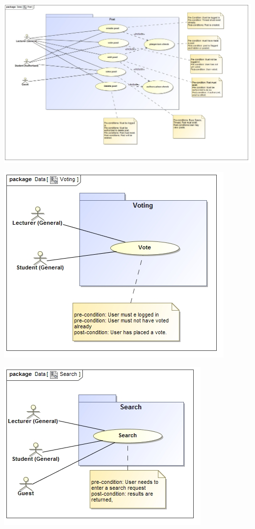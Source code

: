 \documentclass[12pt, oneside]{article}
\begin{document}
\begin{center}
			 \includegraphics[scale=0.45]{Post} 
			 
			 \includegraphics[scale=0.6]{Voting}
			 
			 \includegraphics[scale=0.6]{Search}
			 

\end{center}
\end{document}
